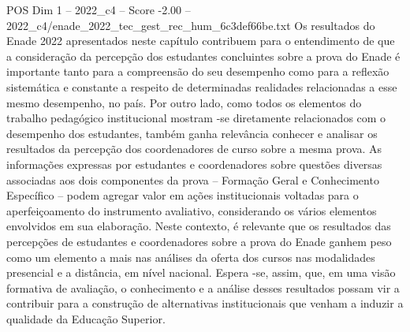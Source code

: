 \begin{textsample}{POS Dim 1 – 2022\_c4 – Score -2.00 – 2022\_c4/enade\_2022\_tec\_gest\_rec\_hum\_6c3def66be.txt}
Os resultados do Enade 2022 apresentados neste capítulo contribuem para o entendimento de que a consideração da percepção dos estudantes concluintes sobre a prova do Enade é importante tanto para a compreensão do seu desempenho como para a reflexão sistemática e constante a respeito de determinadas realidades relacionadas a esse mesmo desempenho, no país.
Por outro lado, como todos os elementos do trabalho pedagógico institucional mostram -se diretamente relacionados com o desempenho dos estudantes, também ganha relevância conhecer e analisar os resultados da percepção dos coordenadores de curso sobre a mesma prova.
As informações expressas por estudantes e coordenadores sobre questões diversas associadas aos dois componentes da prova – Formação Geral e Conhecimento Específico – podem agregar valor em ações institucionais voltadas para o aperfeiçoamento do instrumento avaliativo, considerando os vários elementos envolvidos em sua elaboração.
Neste contexto, é relevante que os resultados das percepções de estudantes e coordenadores sobre a prova do Enade ganhem peso como um elemento a mais nas análises da oferta dos cursos nas modalidades presencial e a distância, em nível nacional.
Espera -se, assim, que, em uma visão formativa de avaliação, o conhecimento e a análise desses resultados possam vir a contribuir para a construção de alternativas institucionais que venham a induzir a qualidade da Educação Superior.

\end{textsample}
